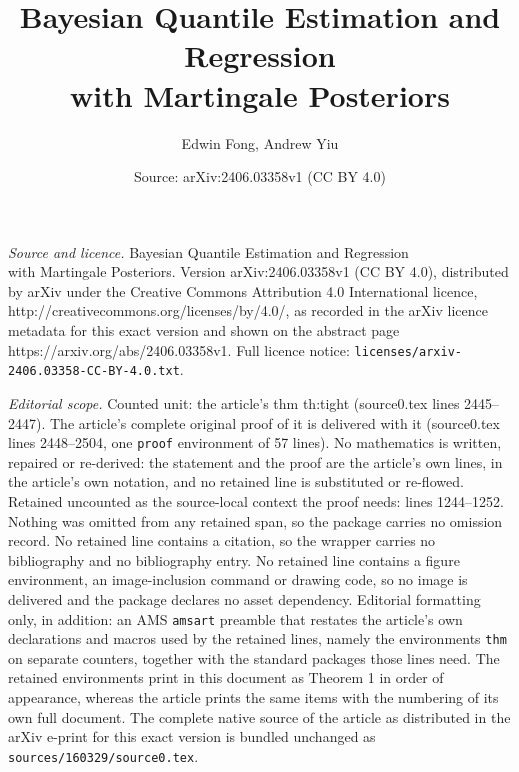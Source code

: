 \documentclass[10pt,a4paper]{amsart}
\title{Bayesian Quantile Estimation and Regression\\ with Martingale Posteriors}
\author{Edwin Fong, Andrew Yiu}
\date{Source: arXiv:2406.03358v1 (CC BY 4.0)}
\begin{document}
\maketitle

\noindent\emph{Source and licence.} Bayesian Quantile Estimation and Regression\\ with Martingale Posteriors. Version arXiv:2406.03358v1 (CC BY 4.0), distributed by arXiv under the Creative Commons Attribution 4.0 International licence, http://creativecommons.org/licenses/by/4.0/, as recorded in the arXiv licence metadata for this exact version and shown on the abstract page https://arxiv.org/abs/2406.03358v1. Full licence notice: \texttt{licenses/arxiv-2406.03358-CC-BY-4.0.txt}.\par\smallskip

\noindent\textit{Editorial scope.} Counted unit: the article's thm th:tight (source0.tex lines 2445--2447). The article's complete original proof of it is delivered with it (source0.tex lines 2448--2504, one \texttt{proof} environment of 57 lines). No mathematics is written, repaired or re-derived: the statement and the proof are the article's own lines, in the article's own notation, and no retained line is substituted or re-flowed.  Retained uncounted as the source-local context the proof needs: lines 1244--1252.  Nothing was omitted from any retained span, so the package carries no omission record.  No retained line contains a citation, so the wrapper carries no bibliography and no bibliography entry.  No retained line contains a figure environment, an image-inclusion command or drawing code, so no image is delivered and the package declares no asset dependency.  Editorial formatting only, in addition: an AMS \texttt{amsart} preamble that restates the article's own declarations and macros used by the retained lines, namely the environments \texttt{thm} on separate counters, together with the standard packages those lines need.  The retained environments print in this document as Theorem 1 in order of appearance, whereas the article prints the same items with the numbering of its own full document.  The complete native source of the article as distributed in the arXiv e-print for this exact version is bundled unchanged as \texttt{sources/160329/source0.tex}.
\end{document}
